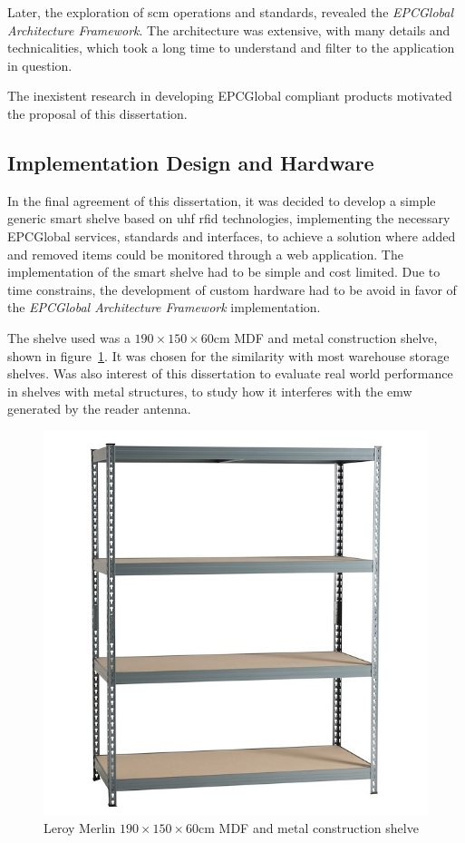 Later, the exploration of \ac{scm} operations and standards, revealed the \emph{EPCGlobal Architecture Framework}. The architecture was extensive, with many details and technicalities, which took a long time to understand and filter to the application in question.

The inexistent research in developing EPCGlobal compliant products motivated the proposal of this dissertation.

\subsection{Implementation Design and Hardware}

In the final agreement of this dissertation, it was decided to develop a simple generic smart shelve based on \ac{uhf} \ac{rfid} technologies, implementing the necessary EPCGlobal services, standards and interfaces, to achieve a solution where added and removed items could be monitored through a web application.
The implementation of the smart shelve had to be simple and cost limited. 
Due to time constrains, the development of custom hardware had to be avoid in favor of the \emph{EPCGlobal Architecture Framework} implementation.

The shelve used was a $190\times150\times60$cm MDF and metal construction shelve, shown in figure~\ref{fig:commercialshelve}. It was chosen for the similarity with most warehouse storage shelves. Was also interest of this dissertation to evaluate real world performance in shelves with metal structures, to study how it interferes with the \ac{emw} generated by the reader antenna.

\begin{figure}
    \centering
    \includegraphics[width=0.6\linewidth]{./figs/estantedemetal.jpg}
    \caption{Leroy Merlin $190\times150\times60$cm MDF and metal construction shelve~\cite{EstanteMetalSpaceo}} 
    \label{fig:commercialshelve}
\end{figure}

